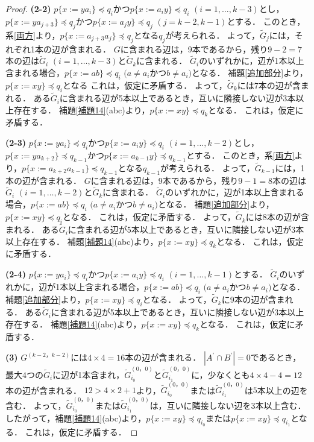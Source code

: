 \begin{proof}
\textbf{(2-2)} 
$p \{ x:=ya_{i} \} \preceq q_{i}$かつ$p \{ x:=a_{i}y \} \preceq q_{i}$ $(i=1, \ldots, k-3)$とし，$p \{ x:=ya_{j+3} \} \preceq q_{j}$かつ$p \{ x:=a_{j}y \} \preceq q_{j}$ $(j=k-2,k-1)$とする．
このとき，系\ref{両方}より，$p \{ x:=a_{j+3}a_{j} \} \preceq q_{j}$となる$q_{j}$が考えられる．
よって，$\tilde{G}_{j}$には，それぞれ1本の辺が含まれる．
$G$に含まれる辺は，9本であるから，残り$9-2=7$本の辺は$\tilde{G}_{i}$ $(i=1, \ldots, k-3)$と$\tilde{G}_{k}$に含まれる．
$\tilde{G}_{i}$のいずれかに，辺が1本以上含まれる場合，$p \{ x:=ab \} \preceq q_{i}$ $(a \not = a_{i}$かつ$b \not = a_{i})$となる．
補題\ref{追加部分}より，$p \{ x:=xy \} \preceq q_{i}$となる
これは，仮定に矛盾する．
よって，$\tilde{G}_{k}$には$7$本の辺が含まれる．
ある$\tilde{G}_{i}$に含まれる辺が5本以上であるとき，互いに隣接しない辺が3本以上存在する．
補題\ref{補題14}(abc)より，$p \{x:=xy \} \preceq q_{k}$となる．
これは，仮定に矛盾する．

\textbf{(2-3)} 
$p \{ x:=ya_{i} \} \preceq q_{i}$かつ$p \{ x:=a_{i}y \} \preceq q_{i}$ $(i=1, \ldots, k-2)$とし，$p \{ x:=ya_{k+2} \} \preceq q_{k-1}$かつ$p \{ x:=a_{k-1}y \} \preceq q_{k-1}$とする．
このとき，系\ref{両方}より，$p \{ x:=a_{k+2}a_{k-1} \} \preceq q_{k-1}$となる$q_{k-1}$が考えられる．
よって，$\tilde{G}_{k-1}$には，1本の辺が含まれる．
$G$に含まれる辺は，9本であるから，残り$9-1=8$本の辺は$\tilde{G}_{i}$ $(i=1, \ldots, k-2)$と$\tilde{G}_{k}$に含まれる．
$\tilde{G}_{i}$のいずれかに，辺が1本以上含まれる場合，$p \{ x:=ab \} \preceq q_{i}$ $(a \not = a_{i}$かつ$b \not = a_{i})$となる．
補題\ref{追加部分}より，$p \{ x:=xy \} \preceq q_{i}$となる．
これは，仮定に矛盾する．
よって，$\tilde{G}_{k}$には$8$本の辺が含まれる．
ある$\tilde{G}_{i}$に含まれる辺が5本以上であるとき，互いに隣接しない辺が3本以上存在する．
補題\ref{補題14}(abc)より，$p \{x:=xy \} \preceq q_{k}$となる．
これは，仮定に矛盾する．

\textbf{(2-4)} 
$p \{ x:=ya_{i} \} \preceq q_{i}$かつ$p \{ x:=a_{i}y \} \preceq q_{i}$ $(i=1, \ldots, k-1)$とする．
$\tilde{G}_{i}$のいずれかに，辺が1本以上含まれる場合，$p \{ x:=ab \} \preceq q_{i}$ $(a \not = a_{i}$かつ$b \not = a_{i})$となる．
補題\ref{追加部分}より，$p \{ x:=xy \} \preceq q_{i}$となる．
よって，$\tilde{G}_{k}$に$9$本の辺が含まれる．
ある$\tilde{G}_{i}$に含まれる辺が5本以上であるとき，互いに隣接しない辺が3本以上存在する．
補題\ref{補題14}(abc)より，$p \{x:=xy \} \preceq q_{k}$となる．
これは，仮定に矛盾する．

\noindent\textbf{(3)}
$G^{(k-2，k-2)}$には$4\times4=16$本の辺が含まれる．
$| A^{\prime} \cap B^{\prime} | = 0$であるとき，最大$4$つの$\tilde{G}_{i}$に辺が1本含まれ，$\tilde{G}^{(0，0)}_{i_{0}}$と$\tilde{G}^{(0，0)}_{i_{1}}$に，少なくとも$4 \times 4-4=12$本の辺が含まれる．
$12 > 4 \times 2 + 1$より，$\tilde{G}^{(0，0)}_{i_{0}}$または$\tilde{G}^{(0，0)}_{i_{1}}$は$5$本以上の辺を含む．
よって，$\tilde{G}^{(0，0)}_{i_{0}}$または$\tilde{G}^{(0，0)}_{i_{1}}$は，互いに隣接しない辺を3本以上含む．
したがって，補題\ref{補題14}(abc)より，$p \{x:=xy \} \preceq q_{i_{0}}$または$p \{x:=xy \} \preceq q_{i_{1}}$となる．
これは，仮定に矛盾する．  


\end{proof}
